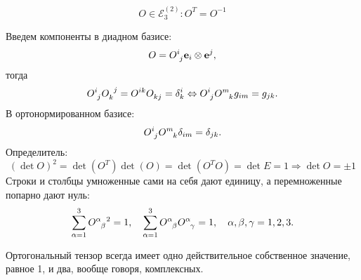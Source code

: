 \begin{definition}
	\begin{equation*}
		O\in\mathcal{E}_3^{(2)}: O^T=O^{-1}
	\end{equation*}
\end{definition}
Введем компоненты в диадном базисе:
\begin{equation*}
	O = \tensor{O}{^i_j}\mathbf{e}_i\otimes\mathbf{e}^j,
\end{equation*}
тогда
\begin{equation*}
	\tensor{O}{^i_j}\tensor{O}{_k^j}=\tensor{O}{^i^k}\tensor{O}{_k_j}=\delta^i_k \Leftrightarrow
	\tensor{O}{^i_j}\tensor{O}{^m_k}g_{im}=g_{jk}.
\end{equation*}
В ортонормированном базисе:
\begin{equation*}
	\tensor{O}{^i_j}\tensor{O}{^m_k}\delta_{im}=\delta_{jk}.
\end{equation*}
Определитель:
\begin{equation*}
	\left(\det O\right)^2 = \det(O^T)\det(O) = \det(O^TO)=\det E = 1 \Rightarrow \det O = \pm1
\end{equation*}
Строки и столбцы умноженные сами на себя дают единицу, а перемноженные попарно дают нуль:
\begin{equation*}
	\sum_{\alpha=1}^{3}\tensor{O}{^\alpha_\beta}^2=1,\quad\sum_{\alpha=1}^{3}\tensor{O}{^\alpha_\beta}\tensor{O}{^\alpha_\gamma}=1,\quad \alpha,\beta,\gamma=1,2,3.
\end{equation*}

Ортогональный тензор всегда имеет одно действительное собственное значение, равное 1, и два, вообще говоря, комплексных.

